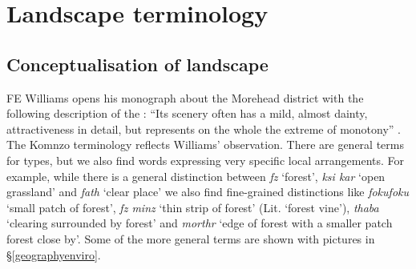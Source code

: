 \section{Landscape terminology}\label{landscapeterminology}

\subsection{Conceptualisation of landscape}\label{cncptlndscp}

FE Williams opens his monograph about the Morehead district with the following description of the : ``Its scenery often has a mild, almost dainty, attractiveness in detail, but represents on the whole the extreme of monotony'' \citep[1]{Williams:1936transfly}. The Komnzo terminology reflects Williams' observation. There are general terms for  types, but we also find words expressing very specific local arrangements. For example, while there is a general distinction between \emph{fz} `forest', \emph{ksi kar} `open grassland' and \emph{fath} `clear place' we also find fine-grained distinctions like \emph{fokufoku} `small patch of forest', \emph{fz minz} `thin strip of forest' (Lit. `forest vine'), \emph{thaba} `clearing surrounded by forest' and \emph{morthr} `edge of forest with a smaller patch forest close by'. Some of the more general terms are shown with pictures in \S{}\ref{geographyenviro}.\\

